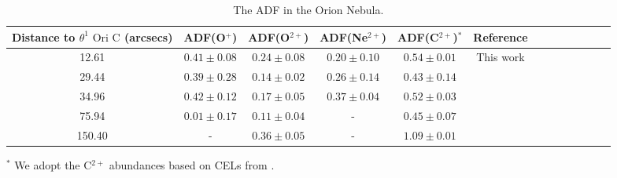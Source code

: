 \documentclass[fleqn,usenatbib]{mnras}
\begin{document}
\begin{table}
\centering
\caption{The ADF in the Orion Nebula.}
\label{tab:ADF}
\begin{tabular}{ccccccccccccc}
\hline
Distance to $\theta^{1} \text{ Ori C}$  (arcsecs)&  ADF(O$^{+}$) & ADF(O$^{2+}$) & ADF(Ne$^{2+}$) & ADF(C$^{2+}$)$^{*}$ & Reference\\
\hline
12.61 & $0.41\pm 0.08$ & $0.24 \pm 0.08$ & $0.20 \pm 0.10$& $0.54 \pm 0.01$ & This work\\
29.44 & $0.39 \pm 0.28$& $0.14 \pm 0.02$ & $0.26\pm 0.14$ & $0.43\pm 0.14$ &\citet{Esteban04}\\
34.96 & $0.42 \pm 0.12$ &$0.17 \pm 0.05$ & $0.37\pm 0.04$ &$0.52 \pm 0.03$ &\citet{mendez2021}\\
75.94 & $0.01\pm 0.17$ & $0.11\pm 0.04$ & - &$0.45 \pm 0.07$ & \citet{mesadelgado09}\\
150.40 & - & $0.36 \pm 0.05$&-& $1.09\pm 0.01$& \citet{mendez2021-2}\\
\hline
\end{tabular}
\begin{description}
\item $^*$ We adopt the C$^{2+}$ abundances based on CELs from \citet{walter92}. \\
\end{description}
\end{table}
\end{document}

